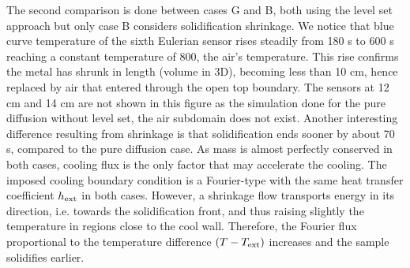 The second comparison is done between cases G and B, both using the level set approach but only case B considers solidification shrinkage.
We notice that blue curve temperature of the sixth 
Eulerian sensor rises steadily from 180 s to 600 s reaching a constant temperature of \SI{800}{\udegC}, the air's temperature. 
This rise confirms the metal has shrunk in length (volume in 3D),
becoming less than 10 cm, hence replaced by air that entered through the open top boundary.
The sensors at 12 cm and 14 cm are not shown in this figure as the simulation done for the pure diffusion without level set, the air subdomain does not exist.
Another interesting difference resulting from shrinkage is that solidification ends sooner by about 70 s, compared to the pure diffusion case.
As mass is almost perfectly conserved in both cases, cooling flux is the only factor that may accelerate the cooling. The imposed cooling boundary condition
is a Fourier-type with the same heat transfer coefficient $h_{\text{ext}}$ in both cases. However, a shrinkage flow transports energy in its direction, i.e. towards the solidification
front, and thus raising slightly the temperature in regions close to the cool wall. Therefore, the Fourier flux proportional to the temperature difference $(T-T_{\text{ext}})$ increases
and the sample solidifies earlier. 

